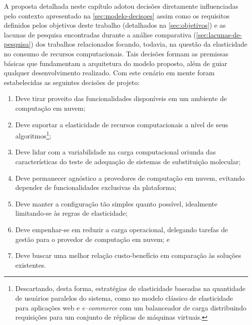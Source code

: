 \documentclass[english,brazilian]{UNISINOSmonografia} %
\begin{document}
A proposta detalhada neste capítulo adotou decisões diretamente influenciadas pelo contexto apresentado na \autoref{sec:modelo-decisoes} assim como os requisitos definidos pelos objetivos deste trabalho (detalhados na \autoref{sec:objetivos}) e as lacunas de pesquisa encontradas durante a análise comparativa (\autoref{sec:lacunas-de-pesquisa}) dos trabalhos relacionados focando, todavia, na questão da elasticidade no consumo de recursos computacionais.
Tais decisões formam as premissas básicas que fundamentam a arquitetura do modelo proposto, além de guiar qualquer desenvolvimento realizado.
Com este cenário em mente foram estabelecidas as seguintes decisões de projeto:
\begin{enumerate}[label=Decisão~\arabic*:,itemindent=*,leftmargin=*]
	\label{list:decisoes-de-projeto}
	
	\item Deve tirar proveito das funcionalidades disponíveis em um ambiente de computação em nuvem;

	\item Deve suportar a elasticidade de recursos computacionais a nível de seus algoritmos\footnote{
	Descartando, desta forma, estratégias de elasticidade baseadas na quantidade de usuários paralelos do sistema, como no modelo clássico de elasticidade para aplicações web e \textit{e--commerce} com um balanceador de carga distribuindo requisições para um conjunto de réplicas de máquinas virtuais.
};
	
	\item Deve lidar com a variabilidade na carga computacional oriunda das características do teste de adequação de sistemas de substituição molecular;
	
	\item Deve permanecer agnóstico a provedores de computação em nuvem, evitando depender de funcionalidades exclusivas da plataforma;
	
	\item Deve manter a configuração tão simples quanto possível, idealmente limitando-se às regras de elasticidade;

	\item Deve empenhar-se em reduzir a carga operacional, delegando tarefas de gestão para o provedor de computação em nuvem; e

	\item Deve buscar uma melhor relação custo-benefício em comparação às soluções existentes.
\end{enumerate}
\end{document}
